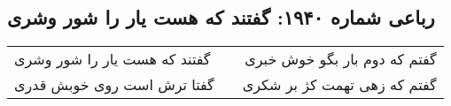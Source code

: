\begin{center}
\section*{رباعی شماره ۱۹۴۰: گفتند که هست یار را شور وشری}
\label{sec:1940}
\begin{longtable}{l p{0.5cm} r}
گفتند که هست یار را شور وشری
&&
گفتم که دوم بار بگو خوش خبری
\\
گفتا ترش است روی خوبش قدری
&&
گفتم که زهی تهمت کژ بر شکری
\\
\end{longtable}
\end{center}
